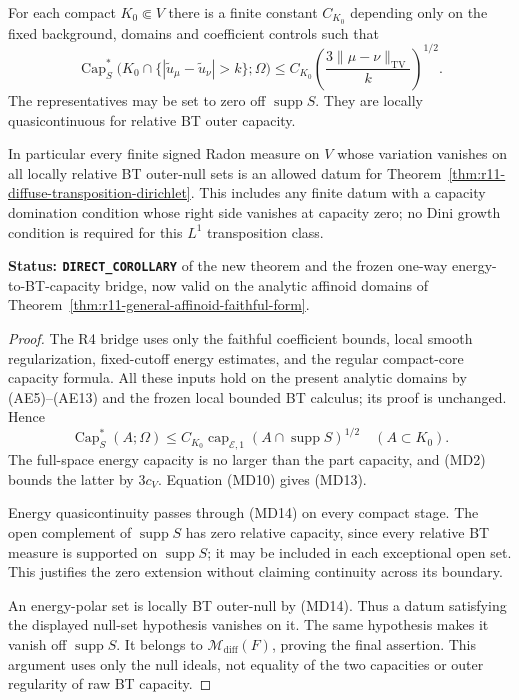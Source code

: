 \begin{proposition}
\label{prop:r11-bt-capacity-diffuse-dirichlet}
For each compact $K_0\Subset V$ there is a finite constant
$C_{K_0}$ depending only on the fixed background, domains and
coefficient controls such that
\[
 \operatorname{Cap}_S^*
   \bigl(K_0\cap\{|\widetilde u_\mu-\widetilde u_\nu|>k\};\Omega\bigr)
       \leq C_{K_0}
           \left(\frac{3\|\mu-\nu\|_{\mathrm{TV}}}{k}\right)^{1/2}.
 \tag{MD13}
\]
The representatives may be set to zero off $\operatorname{supp}S$.
They are locally quasicontinuous for relative BT outer capacity.

In particular every finite signed Radon measure on $V$ whose
variation vanishes on all locally relative BT outer-null sets
is an allowed datum for Theorem~\ref{thm:r11-diffuse-transposition-dirichlet}.
This includes any finite datum with a capacity domination
condition whose right side vanishes at capacity zero; no Dini
growth condition is required for this $L^1$ transposition class.
\end{proposition}

\noindent\textbf{Status: \texttt{DIRECT\_COROLLARY}} of the
new theorem and the frozen one-way energy-to-BT-capacity bridge,
now valid on the analytic affinoid domains of
Theorem~\ref{thm:r11-general-affinoid-faithful-form}.

\begin{proof}
The R4 bridge uses only the faithful coefficient bounds,
local smooth regularization, fixed-cutoff energy estimates,
and the regular compact-core capacity formula.  All these
inputs hold on the present analytic domains by (AE5)--(AE13)
and the frozen local bounded BT calculus; its proof is
unchanged.  Hence
\[
 \operatorname{Cap}_S^*(A;\Omega)
       \leq C_{K_0}\operatorname{cap}_{\mathcal E,1}
                  (A\cap\operatorname{supp}S)^{1/2}
                         \quad(A\subset K_0).
 \tag{MD14}
\]
The full-space energy capacity is no larger than the part
capacity, and (MD2) bounds the latter by $3c_V$.
Equation (MD10) gives (MD13).

Energy quasicontinuity passes through (MD14) on every compact
stage.  The open complement of $\operatorname{supp}S$ has
zero relative capacity, since every relative BT measure is
supported on $\operatorname{supp}S$; it may be included in
each exceptional open set.  This justifies the zero extension
without claiming continuity across its boundary.

An energy-polar set is locally BT outer-null by (MD14).
Thus a datum satisfying the displayed null-set hypothesis
vanishes on it.  The same hypothesis makes it vanish off
$\operatorname{supp}S$.  It belongs to
$\mathcal M_{\mathrm{diff}}(F)$, proving the final assertion.
This argument uses only the null ideals, not equality of the
two capacities or outer regularity of raw BT capacity.
\end{proof}


